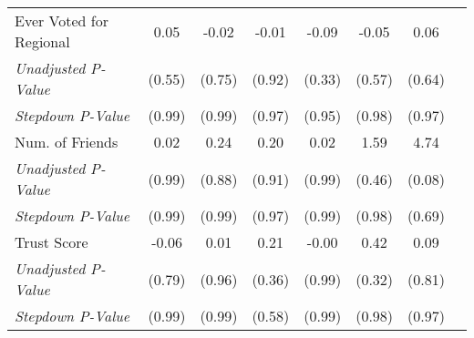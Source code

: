 \begin{tabular}{l c c c c c c c}
Ever Voted for Regional & 0.05 & -0.02 & -0.01 & -0.09 & -0.05 & 0.06 \\
\quad \textit{Unadjusted P-Value} & (0.55) & (0.75) & (0.92) & (0.33) & (0.57) & (0.64) \\
\quad \textit{Stepdown P-Value} & (0.99) & (0.99) & (0.97) & (0.95) & (0.98) & (0.97) \\
Num. of Friends & 0.02 & 0.24 & 0.20 & 0.02 & 1.59 & 4.74 \\
\quad \textit{Unadjusted P-Value} & (0.99) & (0.88) & (0.91) & (0.99) & (0.46) & (0.08) \\
\quad \textit{Stepdown P-Value} & (0.99) & (0.99) & (0.97) & (0.99) & (0.98) & (0.69) \\
Trust Score & -0.06 & 0.01 & 0.21 & -0.00 & 0.42 & 0.09 \\
\quad \textit{Unadjusted P-Value} & (0.79) & (0.96) & (0.36) & (0.99) & (0.32) & (0.81) \\
\quad \textit{Stepdown P-Value} & (0.99) & (0.99) & (0.58) & (0.99) & (0.98) & (0.97) \\
\bottomrule
\end{tabular}
